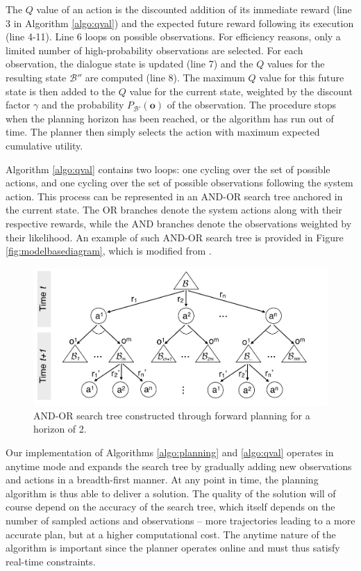 The $Q$ value of an action is the discounted addition of its immediate reward (line 3 in Algorithm \ref{algo:qval}) and the expected future reward following its execution (line 4-11).  Line 6 loops on possible observations.  For efficiency reasons, only a limited number of high-probability observations are selected. For each observation, the dialogue state is updated (line 7) and the $Q$ values for the resulting state $\mathcal{B}''$ are computed (line 8).  The maximum $Q$ value for this future state is then added to the $Q$ value for the current state, weighted by the discount factor $\gamma$ and the probability $P_{\mathcal{B}'} (\mathbf{o})$ of the observation.  The procedure stops when the planning horizon has been reached, or the algorithm has run out of time. The planner then simply selects the action with maximum expected cumulative utility. 

Algorithm \ref{algo:qval} contains two loops: one cycling over the set of possible actions, and one cycling over the set of possible observations following the system action. This process can be represented in an AND-OR search tree anchored in the current state. The OR branches denote the system actions along with their respective rewards, while the AND branches denote the observations weighted by their likelihood. An example of such AND-OR search tree is provided in Figure \ref{fig:modelbasediagram}, which is modified from \cite{ross2008}.


\begin{figure}[h!]
\centering
\includegraphics[scale=0.30]{imgs/andortree.pdf}
\caption{AND-OR search tree constructed through forward planning for a horizon of 2.}
\label{fig:andortree}
\end{figure}

Our implementation of Algorithms \ref{algo:planning} and \ref{algo:qval} operates in anytime mode and expands the search tree by gradually adding new observations and actions in a breadth-first manner. At any point in time, the planning algorithm is thus able to deliver a solution. The quality of the solution will of course depend on the accuracy of the search tree, which itself depends on the number of sampled actions and observations -- more trajectories leading to a more accurate plan, but at a higher computational cost.  The anytime nature of the algorithm is important since the planner operates online and must thus satisfy real-time constraints.  

